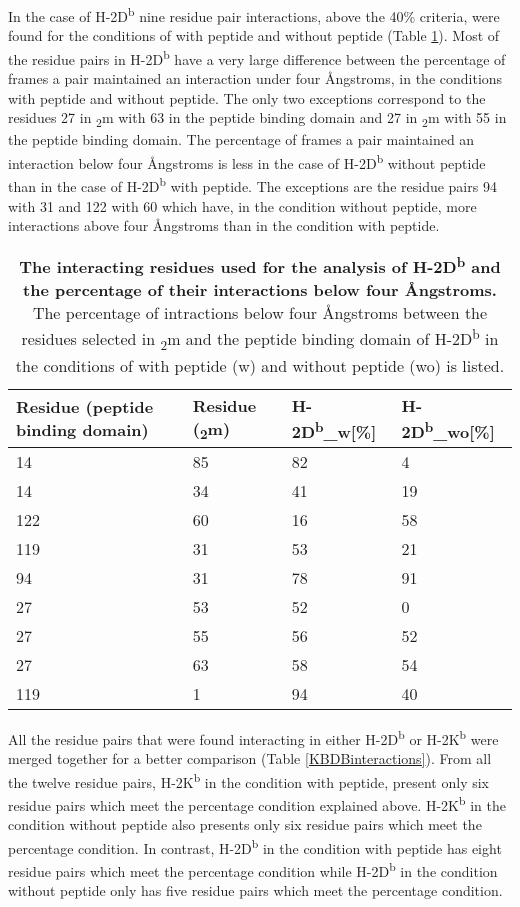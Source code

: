 \documentclass[11pt,twocolumn]{article}
\newcommand{\db}{H-2D\textsuperscript{b}\xspace}
\newcommand{\dbw}{H-2D\textsuperscript{b}\_w\xspace}
\newcommand{\dbwo}{H-2D\textsuperscript{b}\_wo\xspace}
\newcommand{\kb}{H-2K\textsuperscript{b}\xspace}
\newcommand{\angstr}{{\AA}ngstroms\xspace}
\newcommand{\btm}{\textbeta\textsubscript{2}m\xspace}
\begin{document}
In the case of \db nine residue pair interactions, above the 40\% criteria,
were found for the conditions of with peptide and without peptide (Table
\ref{DBinteractions}). Most of the residue pairs in \db have a very large
difference between the percentage of frames a pair maintained an interaction
under four \angstr,  in the conditions with peptide and  without peptide.
The only two exceptions correspond to the residues 27 in \btm with 63 in the
peptide binding domain and 27 in \btm with 55 in the peptide binding domain.
The percentage of frames a pair maintained an interaction below four \angstr is
less in the case of \db without peptide than in the case of \db with peptide.
The exceptions are the residue pairs 94 with 31 and 122 with 60 which have, in
the condition without peptide, more interactions above four \angstr than in the
condition with peptide.  
 
 
 
\begin{table}[H]
\caption{\textbf{The interacting residues used for the analysis of \db and the
	percentage of their interactions below four \angstr. } The percentage
	of intractions below four \angstr between the residues selected in \btm
	and the peptide binding domain of \db in the conditions of with peptide
(w) and without peptide (wo) is listed.}
\label{DBinteractions}
\begin{tabularx}{\linewidth}{|X|X|X|X|}  \hline
Residue (peptide binding domain)&Residue (\btm)&\dbw [\%]&\dbwo [\%]\\ \hline
14&85&82&4\\ \hline
14&34&41&19\\ \hline
122&60&16&58\\ \hline
119&31&53&21\\ \hline
94&31&78&91\\ \hline
27&53&52&0\\ \hline
27&55&56&52\\ \hline
27&63&58&54\\ \hline
119&1&94&40\\ \hline
\end{tabularx}
\end{table}


All the residue pairs that were found interacting in either \db or \kb were
merged together for a better comparison (Table \ref{KBDBinteractions}). From
all the twelve residue pairs, \kb in the condition with peptide, present only
six residue pairs which meet the percentage condition explained above. \kb in
the condition without peptide also presents only six residue pairs which meet
the percentage condition. In contrast, \db in the condition with peptide has
eight residue pairs which meet the percentage condition while \db in the
condition without peptide only has five residue pairs which meet the percentage
condition. 
\end{document}
